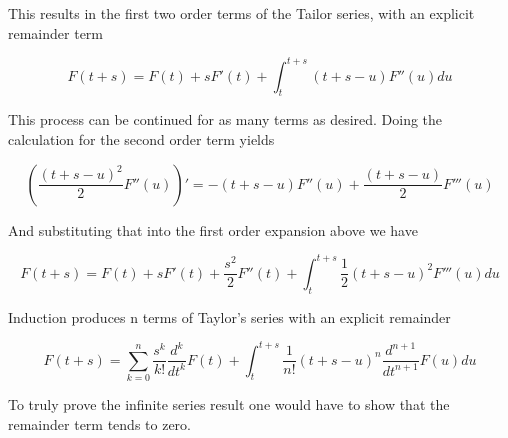 This results in the first two order terms of the Tailor series, with an explicit remainder term

\[
F(t+s) = F(t) + s F'(t) + \int_{t}^{t+s} (t+s-u) F''(u) du
\]

This process can be continued for as many terms as desired.  Doing the calculation for the second order term yields

\[
\left(\frac{(t + s - u)^2}{2} F''(u)\right)' = -( t + s - u ) F''(u) + \frac{(t+s-u)}{2} F'''(u)
\]

And substituting that into the first order expansion above we have

\[
F(t+s) = F(t) + s F'(t) + \frac{s^2}{2} F''(t) + \int_{t}^{t+s} \frac{1}{2}(t+s-u)^2 F'''(u) du
\]

Induction produces n terms of Taylor's series with an explicit remainder

\[
F(t+s) = \sum_{k=0}^{n} \frac{s^k}{k!} \frac{d^k}{dt^k} F(t) +
                        \int_{t}^{t+s} \frac{1}{n!}(t+s-u)^n \frac{d^{n+1}}{dt^{n+1}} F(u) du
\]

To truly prove the infinite series result one would have to show that the remainder term tends to zero.


